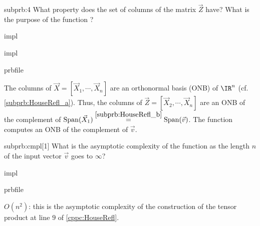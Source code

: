 \begin{problem}
\begin{subproblem}{subprb:4}
  What property does the set of columns of the matrix $\vec{Z}$ have?
  What is the purpose of the function ?

  \begin{samwriteprbpart}{impl}
    \begin{writeverbatim}{prbfile
        \begin{samhint}
          Use \ref{subprb:HouseRefl_a} and \ref{subprb:HouseRefl_b}.
        \end{samhint}
    \end{writeverbatim}
  \end{samwriteprbpart}

  \begin{samwriteprbpart}{impl}
    \begin{writeverbatim}{prbfile}
      \begin{samsolution}
        The columns of $\vec{X} = [\vec{X}_1, \cdots, \vec{X}_n]$
        are an orthonormal basis (ONB) of $\IR^n$ (cf.
        \ref{subprb:HouseRefl_a}). Thus, the columns of
        $\vec{Z} = [\vec{X}_2, \cdots, \vec{X}_n]$ are an ONB of
        the complement of
        $\mathrm{Span}(\vec{X}_1) \overset{\ref{subprb:HouseRefl_b}}{=}
        \mathrm{Span}(\vec{v})$.
        The function  computes an ONB of the
        complement of $\vec{v}$.
      \end{samsolution}
    \end{writeverbatim}
  \end{samwriteprbpart}
  \end{subproblem}

  \begin{subproblem}{subprb:cmpl}[1]
    What is the asymptotic complexity of the function 
    as the length $n$ of the input vector $\vec{v}$ goes to $\infty$?

    \begin{samwriteprbpart}{impl}
      \begin{writeverbatim}{prbfile}
        \begin{samsolution}
          $O(n^2)$: this is the asymptotic complexity of the construction
          of the tensor product at line $9$ of \autoref{cppc:HouseRefl}.
        \end{samsolution}
      \end{writeverbatim}
    \end{samwriteprbpart}
  \end{subproblem}



\end{problem}
